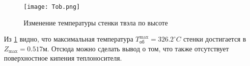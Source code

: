 \begin{figure}[H]
	\begin{center}
		\texttt{[image: Tob.png]}
		\caption{Изменение температуры стенки твэла по высоте}
		\label{pic:Tob} %
	\end{center}
\end{figure}

 Из \ref{pic:Tob} видно, что максимальная температура $T_{\text{об}}^{\max} = 326.2 ^\circ C $ стенки достигается в $Z_{\max} = 0.517 м$. Отсюда можно сделать вывод о том, что также отсутствует поверхностное кипения теплоносителя.


    

